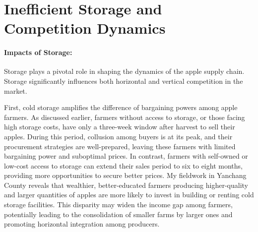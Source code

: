 


\section{Inefficient Storage and Competition Dynamics}


\paragraph{Impacts of Storage:} Storage plays a pivotal role in shaping the dynamics of the apple supply chain. Storage significantly influences both horizontal and vertical competition in the market.

First, cold storage amplifies the difference of bargaining powers among apple farmers. As discussed earlier, farmers without access to storage, or those facing high storage costs, have only a three-week window after harvest to sell their apples. During this period, collusion among buyers is at its peak, and their procurement strategies are well-prepared, leaving these farmers with limited bargaining power and suboptimal prices. In contrast, farmers with self-owned or low-cost access to storage can extend their sales period to six to eight months, providing more opportunities to secure better prices. My fieldwork in Yanchang County reveals that wealthier, better-educated farmers producing higher-quality and larger quantities of apples are more likely to invest in building or renting cold storage facilities. This disparity may widen the income gap among farmers, potentially leading to the consolidation of smaller farms by larger ones and promoting horizontal integration among producers.

